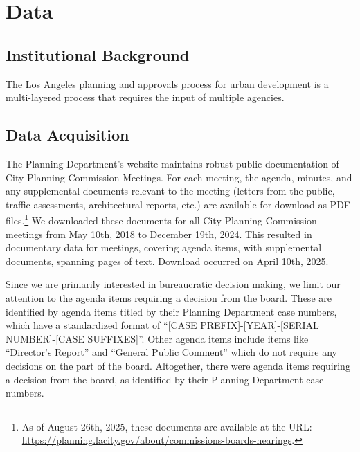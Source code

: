 \section{Data}\label{sec_data}

\subsection{Institutional Background}

The Los Angeles planning and approvals process for urban development is a multi-layered process that requires the input of multiple agencies. 

\subsection{Data Acquisition}

The Planning Department's website maintains robust public documentation of City Planning Commission Meetings. For each meeting, the agenda, minutes, and any supplemental documents relevant to the meeting (letters from the public, traffic assessments, architectural reports, etc.) are available for download as PDF files.\footnote{As of August 26th, 2025, these documents are available at the URL: \url{https://planning.lacity.gov/about/commissions-boards-hearings}.} We downloaded these documents for all City Planning Commission meetings from May 10th, 2018 to December 19th, 2024. This resulted in documentary data for  meetings, covering  agenda items, with  supplemental documents, spanning  pages of text. Download occurred on April 10th, 2025.

Since we are primarily interested in bureaucratic decision making, we limit our attention to the agenda items requiring a decision from the board. These are identified by agenda items titled by their Planning Department case numbers, which have a standardized format of ``[CASE PREFIX]-[YEAR]-[SERIAL NUMBER]-[CASE SUFFIXES]''. Other agenda items include items like ``Director's Report'' and ``General Public Comment'' which do not require any decisions on the part of the board. Altogether, there were  agenda items requiring a decision from the board, as identified by their Planning Department case numbers.

